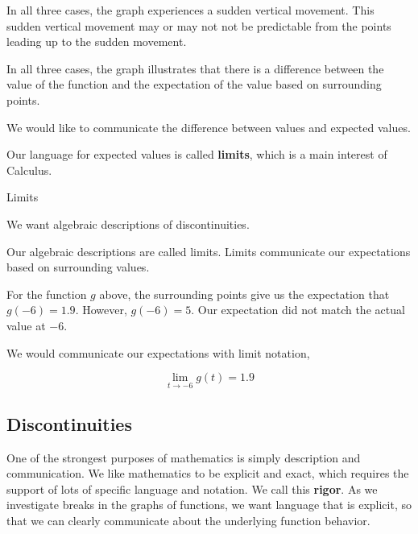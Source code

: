 \documentclass{ximera}
\begin{document}
In all three cases, the graph experiences a sudden vertical movement.  This sudden vertical movement may or may not not be predictable from the points leading up to the sudden movement.


In all three cases, the graph illustrates that there is a difference between the value of the function and the expectation of the value based on surrounding points. 

We would like to communicate the difference between values and expected values.

Our language for expected values is called \textbf{limits}, which is a main interest of Calculus.







\begin{example} Limits

We want algebraic descriptions of discontinuities.

Our algebraic descriptions are called limits. Limits communicate our expectations based on surrounding values.

For the function $g$ above, the surrounding points give us the expectation that $g(-6)=1.9$.  However, $g(-6)=5$.  Our expectation did not match the actual value at $-6$.

We would communicate our expectations with limit notation,


\[ \lim\limits_{t \to -6} g(t) = 1.9 \]



\end{example}











\subsection*{Discontinuities}

One of the strongest purposes of mathematics is simply description and communication.  We like mathematics to be explicit and exact, which requires the support of lots of specific language and notation. We call this \textbf{\textcolor{purple!85!blue}{rigor}}. As we investigate breaks in the graphs of functions, we want language that is explicit, so that we can clearly communicate about the underlying function behavior.
\end{document}
